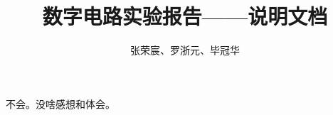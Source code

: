 \documentclass[a4paper]{article}
\begin{document}
\title{数字电路实验报告——说明文档}
\author{张荣宸、罗浙元、毕冠华}
\date{}

\maketitle
\tableofcontents

不会。没啥感想和体会。

% 

% 
% 
\end{document}
